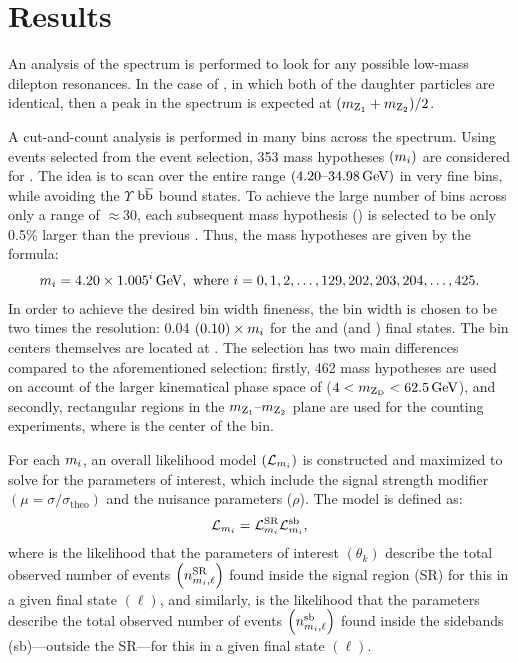 \section{Results}
\label{sec:results_dilep}
An analysis of the \mZtwo spectrum is performed to look for any possible low-mass dilepton resonances.
In the case of \htozdzd, in which both of the daughter particles are identical, then a peak in the \mZtwo spectrum is expected at $(m_{\mathrm{Z}_{\mathrm{1}}} + m_{\mathrm{Z}_{\mathrm{2}}}) / 2$.

A cut-and-count analysis is performed in many bins across the \mZtwo spectrum.
Using events selected from the \zzd event selection, 353 mass hypotheses $\left( m_{i} \right)$ are considered for \mZtwo.
The idea is to scan over the entire \mZtwo range $(4.20\text{--}34.98 \,\text{Ge\hspace{-.08em}V})$ in very fine \mZtwo bins, while avoiding the $\Upsilon$ $\mathrm{b} \overline{\mathrm{b}}$ bound states.  %
To achieve the large number of bins across only a range of $\approx$30\GeV, each subsequent mass hypothesis () is selected to be only 0.5\% larger than the previous .
Thus, the mass hypotheses are given by the formula:
\begin{align*}
    m_{i} = 4.20 \times 1.005^{i} \,\text{Ge\hspace{-.08em}V},
    \text{ where } i = 0,1,2, \ldots, 129, 202, 203, 204, \ldots, 425.
\end{align*}
In order to achieve the desired bin width fineness, the bin width is chosen to be two times the \mZtwo resolution:
0.04 $(0.10) \times m_{i}$ for the \fourmu and \twoetwomu (\foure and \twomutwoe) final states.
The bin centers themselves are located at .
The \zdzd selection has two main differences compared to the aforementioned \zzd selection:
firstly, 462 mass hypotheses are used on account of the larger kinematical phase space of \mZtwo ($4 < m_{\mathrm{Z}_\text{D}} < 62.5\,\text{Ge\hspace{-.08em}V}$),
and secondly, rectangular regions in the $m_{\mathrm{Z}_{\mathrm{1}}} \text{--} m_{\mathrm{Z}_{\mathrm{2}}}$ plane are used for the counting experiments, where  is the center of the bin.

For each $m_{i}$, an overall likelihood model $(\mathcal{L}_{m_{i}})$ is constructed and maximized to solve for the parameters of interest, which include the signal strength modifier $\left( \mu = \sigma / \sigma_\text{theo} \right)$ and the nuisance parameters ($\rho$).
The model is defined as:
\begin{equation*}
    \lhoodm =
    \lhoodSR %
    \lhoodsb, %
\end{equation*}
where \lhoodSR is the likelihood that the parameters of interest $\left( \theta_k \right)$ describe the total observed number of events $\left( n^\text{SR}_{m_{i}, \ell} \right)$ found inside the signal region (SR) for this  in a given final state $(\ell)$,
and similarly, \lhoodsb is the likelihood that the parameters describe the total observed number of events $\left( n^\text{sb}_{m_{i}, \ell} \right)$ found inside the sidebands (sb)---\ie outside the SR---for this  in a given final state $(\ell)$.

